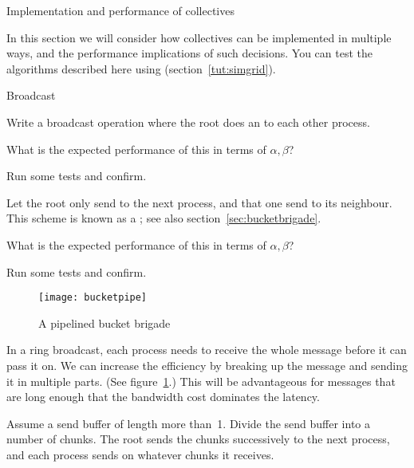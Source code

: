 
 {Implementation and performance of collectives}

In this section we will consider how collectives can be implemented in
multiple ways, and the performance implications of such decisions.
You can test the algorithms described here using 
(section~\ref{tut:simgrid}).

 {Broadcast}


Write a broadcast operation where the root does an  to
each other process.

What is the expected performance of this in terms of $\alpha,\beta$?

Run some tests and confirm.


Let the root only send to the next process, and that one send to its
neighbour. This scheme is known as a ; see
also section~\ref{sec:bucketbrigade}.

What is the expected performance of this in terms of $\alpha,\beta$?

Run some tests and confirm.

\begin{figure}[ht]
  \texttt{[image: bucketpipe]}
  \caption{A pipelined bucket brigade}
  \label{fig:pipe-bucket}
\end{figure}


In a ring broadcast, each process needs to receive the whole message
before it can pass it on. We can increase the efficiency by breaking
up the message and sending it in multiple parts.
(See figure~\ref{fig:pipe-bucket}.)
This will be
advantageous for messages that are long enough that the bandwidth cost
dominates the latency.

Assume a send buffer of length more than~1. Divide the send buffer
into a number of chunks. The root sends the chunks successively to the
next process, and each process sends on whatever chunks it receives.


